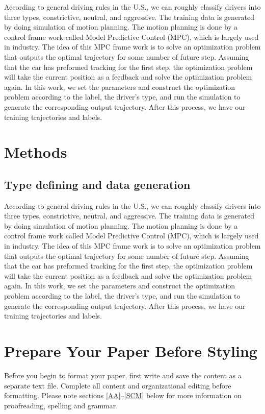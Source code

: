 \documentclass[conference]{IEEEtran}
\begin{document}
According to general driving rules in the U.S., we can roughly classify drivers into three types, constrictive, neutral, and aggressive. The training data is generated by doing simulation of motion planning. The motion planning is done by a control frame work called Model Predictive Control (MPC), which is largely used in industry. The idea of this MPC frame work is to solve an optimization problem that outputs the optimal trajectory for some number of future step. Assuming that the car has preformed tracking for the first step, the optimization problem will take the current position as a feedback and solve the optimization problem again. In this work, we set the parameters and construct the optimization problem according to the label, the driver's type, and run the simulation to generate the corresponding output trajectory. After this process, we have our training trajectories and labels.

\section{Methods}

\subsection{Type defining and data generation}

According to general driving rules in the U.S., we can roughly classify drivers into three types, constrictive, neutral, and aggressive. The training data is generated by doing simulation of motion planning. The motion planning is done by a control frame work called Model Predictive Control (MPC), which is largely used in industry. The idea of this MPC frame work is to solve an optimization problem that outputs the optimal trajectory for some number of future step. Assuming that the car has preformed tracking for the first step, the optimization problem will take the current position as a feedback and solve the optimization problem again. In this work, we set the parameters and construct the optimization problem according to the label, the driver's type, and run the simulation to generate the corresponding output trajectory. After this process, we have our training trajectories and labels.

\section{Prepare Your Paper Before Styling}
Before you begin to format your paper, first write and save the content as a 
separate text file. Complete all content and organizational editing before 
formatting. Please note sections \ref{AA}--\ref{SCM} below for more information on 
proofreading, spelling and grammar.
\end{document}
